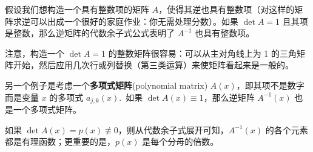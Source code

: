 \begin{example*}
假设我们想构造一个具有整数项的矩阵 $A$，使得其逆也具有整数项（对这样的矩阵求逆可以出成一个很好的家庭作业：你无需处理分数）。如果 $\det A = 1$ 且其项是整数，那么逆矩阵的代数余子式公式表明了 $A^{-1}$ 也具有整数项。
\end{example*}

注意，构造一个 $\det A = 1$ 的整数矩阵很容易：可以从主对角线上为 1 的三角矩阵开始，然后应用几次行或列替换（第三类运算）来使矩阵看起来是一般的。

\begin{example*}
另一个例子是考虑一个\textbf{多项式矩阵}(polynomial matrix) $A(x)$，即其项不是数字而是变量 $x$ 的多项式 $a_{j,k}(x)$.~如果 $\det A(x) \equiv 1$，那么逆矩阵 $A^{-1}(x)$ 也是一个多项式矩阵。
\end{example*}

如果 $\det A(x) = p(x) \not\equiv 0$，则从代数余子式展开可知，$A^{-1}(x)$ 的各个元素都是有理函数；更重要的是，$p(x)$ 是每个分母的倍数。

